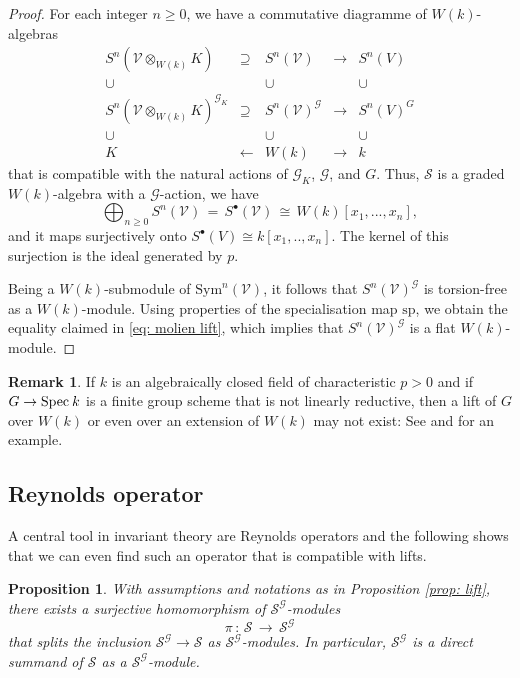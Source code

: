 \documentclass[reqno]{amsart}
\newcommand{\Spec}{{\rm Spec}\:}
\theoremstyle{definition}
\newtheorem{Remark}[Definition]{Remark}
\theoremstyle{plain}
\newtheorem{Proposition}[Definition]{Proposition}
\begin{document}
\begin{proof}
For each integer $n\geq0$, we have a commutative diagramme
of $W(k)$-algebras 
$$
   \begin{array}{ccccc}
    S^n(\mathcal{V}\otimes_{W(k)}K)&\supseteq& S^n(\mathcal{V})&\to& S^n(V)\\
    \cup&& \cup && \cup\\
    S^n(\mathcal{V}\otimes_{W(k)}K)^{\mathcal{G}_K}&\supseteq& S^n(\mathcal{V})^{\mathcal{G}}&\to& S^n(V)^G\\
    \cup&& \cup && \cup \\
    K &\leftarrow& W(k) &\to& k
   \end{array}
$$
that is compatible with the natural actions of $\mathcal{G}_K$, $\mathcal{G}$, and $G$.
Thus, $\mathcal{S}$ is a graded $W(k)$-algebra with a $\mathcal{G}$-action, we have
$$
\bigoplus_{n\geq0} S^n(\mathcal{V})\,=\,S^\bullet(\mathcal{V}) \,\cong\,
W(k)[x_1,...,x_n],
$$
and it maps surjectively onto $S^\bullet(V)\cong k[x_1,..,x_n]$.
The kernel of this surjection is the ideal generated by $p$.

Being a $W(k)$-submodule of $\mathrm{Sym}^n(\mathcal{V})$, it follows
that $S^n(\mathcal{V})^{\mathcal{G}}$ is torsion-free as a $W(k)$-module.
Using properties of the specialisation map $\mathrm{sp}$, we obtain
the equality claimed in \cref{eq: molien lift},
which implies that $S^n(\mathcal{V})^{\mathcal{G}}$ is a flat $W(k)$-module.
\end{proof}

\begin{Remark}
If $k$ is an algebraically closed field of characteristic $p>0$ and
if $G\to\Spec k$ is a finite group scheme that is not linearly reductive, 
then a lift of $G$ over $W(k)$ or even over an extension of $W(k)$
may not exist:
See \cite[Introduction, Example (-B)]{MO} and \cite[page 266]{Oort}
for an example.
\end{Remark} 

\subsection{Reynolds operator}
A central tool in invariant theory are  Reynolds operators
and the following shows that we can even find such an operator
that is compatible with lifts.

\begin{Proposition}
 With assumptions and notations as in Proposition \ref{prop: lift},
 there exists a surjective
 homomorphism of $\mathcal{S}^{\mathcal{G}}$-modules
 $$
  \pi \,:\, \mathcal{S}\,\to\,\mathcal{S}^{\mathcal{G}}
 $$
 that splits the inclusion $\mathcal{S}^{\mathcal{G}}\to\mathcal{S}$
 as $\mathcal{S}^{\mathcal{G}}$-modules.
 In particular, $\mathcal{S}^{\mathcal{G}}$ is a direct summand
 of $\mathcal{S}$ as a $\mathcal{S}^{\mathcal{G}}$-module.
\end{Proposition}
\end{document}
